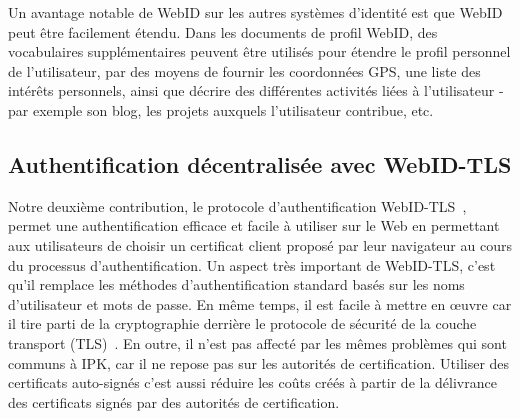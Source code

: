 \documentclass[a4paper]{article}
\begin{document}
Un avantage notable de WebID sur les autres systèmes d'identité est que WebID peut être facilement étendu. Dans les documents de profil WebID, des vocabulaires supplémentaires peuvent être utilisés pour étendre le profil personnel de l'utilisateur, par des moyens de fournir les coordonnées GPS, une liste des intérêts personnels, ainsi que décrire des différentes activités liées à l'utilisateur - par exemple son blog, les projets auxquels l'utilisateur contribue, etc.

\subsection{Authentification décentralisée avec WebID-TLS}
\label{sec:webid-auth}
Notre deuxième contribution, le protocole d'authentification WebID-TLS~\cite{webid-tls}, permet une authentification efficace et facile à utiliser sur le Web en permettant aux utilisateurs de choisir un certificat client proposé par leur navigateur au cours du processus d'authentification. Un aspect très important de WebID-TLS, c'est qu'il remplace les méthodes d'authentification standard basés sur les noms d'utilisateur et mots de passe. En même temps, il est facile à mettre en œuvre car il tire parti de la cryptographie derrière le protocole de sécurité de la couche transport (TLS)~\cite{dierks2008transport}. En outre, il n'est pas affecté par les mêmes problèmes qui sont communs à IPK, car il ne repose pas sur les autorités de certification. Utiliser des certificats auto-signés c'est aussi réduire les coûts créés à partir de la délivrance des certificats signés par des autorités de certification.\\
\end{document}
